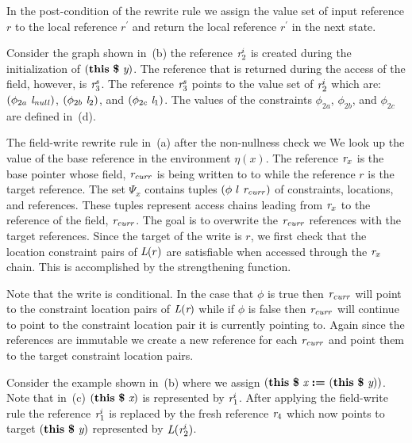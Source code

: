 

In the post-condition of the rewrite rule we assign
the value set of input reference $r$ to the local reference $r^\prime$
and return the local reference $r^\prime$ in the next state.

Consider the graph shown in~(b) the reference
$\emph{r}_2^i$ is created during the initialization of $\lp\cfgt{this}\  \cfgt{\$}\ \cfgnt{y}\rp$. The
reference that is returned during the access of the field, however, is
$\emph{r}_3^s$. The reference $\emph{r}_3^s$ points to the value set of $\emph{r}_2^i$
which are: $(\phi_{2a}\ \emph{l}_\mathit{null})$, $(\phi_{2b}\ \emph{l}_2)$, and
$(\phi_{2c}\ \emph{l}_1)$. The values of the constraints $\phi_{2a}$,
$\phi_{2b}$, and $\phi_{2c}$ are defined in~(d).

The field-write rewrite rule in~(a) after the
non-nullness check we We look up the value of the base reference in
the environment $\eta(x)$.  The reference $\emph{r}_x$ is the base pointer
whose field, $\emph{r}_\mathit{curr}$ is being written to to while the
reference $r$ is the target reference. The set $\Psi_x$ contains
tuples $(\phi\ l\ \cfgnt{r}_\mathit{curr})$ of constraints, locations, and
references. These tuples represent access chains leading from $\emph{r}_x$ to
the reference of the field, $\emph{r}_\mathit{curr}$. The goal is to
overwrite the $\emph{r}_\mathit{curr}$ references with the target
references. Since the target of the write is $r$, we first check that
the location constraint pairs of $\emph{L}(r)$ are satisfiable when accessed
through the $\emph{r}_x$ chain. This is accomplished by the strengthening
function.



Note that the write is conditional. In the case that $\phi$ is true
then $\emph{r}_\mathit{curr}$ will point to the constraint location pairs of
$\emph{L}(\emph{r})$ while if $\phi$ is false then $\emph{r}_\mathit{curr}$ will continue
to point to the constraint location pair it is currently pointing to.
Again since the references are immutable we create a new reference for
each $\emph{r}_\mathit{curr}$ and point them to the target constraint
location pairs.

Consider the example shown in~(b) where we assign
$\lp\cfgt{this}\  \cfgt{\$}\ \cfgnt{x}\ \cfgt{:=}\ \lp\cfgt{this}\  \cfgt{\$}\ \cfgnt{y}\rp\rp$. Note that
in~(c) $\lp\cfgt{this}\  \cfgt{\$}\ \cfgnt{x}\rp$ is represented by
$\emph{r}_1^i$. After applying the field-write rule the reference $\emph{r}_1^i$ is
replaced by the fresh reference $\emph{r}_4$ which now points to target
 $\lp\cfgt{this}\  \cfgt{\$}\ \cfgnt{y}\rp$ represented by $\emph{L}(\emph{r}_2^i)$.


